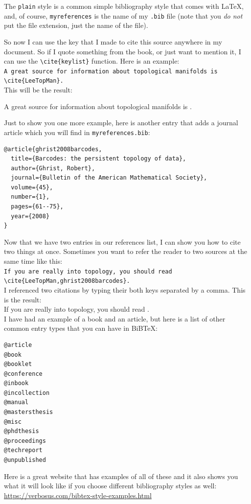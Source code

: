 \documentclass{article}
\newcommand{\nid}{\noindent} %
\newcommand{\myrefs}{\texttt{myreferences.bib}}
\begin{document}
The \verb|plain| style is a common simple bibliography style that comes with \LaTeX, and, of course, \verb|myreferences| is the name of my \verb|.bib| file (note that you \emph{do not} put the file extension, just the name of the file).

So now I can use the key that I made to cite this source anywhere in my document.  So if I quote something from the book, or just want to mention it, I can use the \verb|\cite{keylist}| function.  Here is an example:\\

\nid\verb|A great source for information about topological manifolds is \cite{LeeTopMan}.|\\

\nid This will be the result:

\nid A great source for information about topological manifolds is \cite{LeeTopMan}.

Just to show you one more example, here is another entry that adds a journal article which you will find in \myrefs:
\begin{verbatim}
@article{ghrist2008barcodes,
  title={Barcodes: the persistent topology of data},
  author={Ghrist, Robert},
  journal={Bulletin of the American Mathematical Society},
  volume={45},
  number={1},
  pages={61--75},
  year={2008}
}
\end{verbatim}

Now that we have two entries in our references list, I can show you how to cite two things at once.  Sometimes you want to refer the reader to two sources at the same time like this:\\

\nid \verb|If you are really into topology, you should read \cite{LeeTopMan,ghrist2008barcodes}.|\\

\nid I referenced two citations by typing their both keys separated by a comma.  This is the result:\\

If you are really into topology, you should read \cite{LeeTopMan,ghrist2008barcodes}.\\

I have had an example of a book and an article, but here is a list of other common entry types that you can have in BiB\TeX:
\begin{multicols}{2}
\begin{verbatim}
@article
@book
@booklet
@conference
@inbook
@incollection
@manual
@mastersthesis
@misc
@phdthesis
@proceedings
@techreport
@unpublished
\end{verbatim}
\end{multicols}
\nid Here is a great website that has examples of all of these and it also shows you what it will look like if you choose different bibliography styles as well:\\
\url{https://verbosus.com/bibtex-style-examples.html}\\
\end{document}
